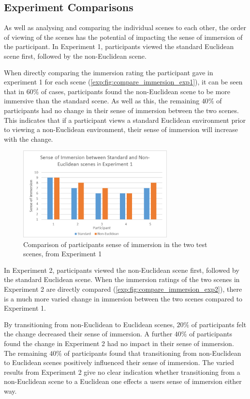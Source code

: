 		\subsection{Experiment Comparisons}
		\label{exp:exp:comp}

			As well as analysing and comparing the individual scenes to each other, the order of viewing of the scenes has the potential of impacting the sense of immersion of the participant.
			In Experiment 1, participants viewed the standard Euclidean scene first, followed by the non-Euclidean scene.

			When directly comparing the immersion rating the participant gave in experiment 1 for each scene (\autoref{exp:fig:compare_immersion_exp1}), it can be seen that in $60\%$ of cases, participants found the non-Euclidean scene to be more immersive than the standard scene.
			As well as this, the remaining $40\%$ of participants had no change in their sense of immersion between the two scenes.
			This indicates that if a participant views a standard Euclidean environment prior to viewing a non-Euclidean environment, their sense of immersion will increase with the change.

			\begin{figure}[H]
				\includegraphics[width=0.7\textwidth]{Images/Compare_Immersion_Exp_1}
				\centering
				\caption{Comparison of participants sense of immersion in the two test scenes, from Experiment 1}
				\label{exp:fig:compare_immersion_exp1}
			\end{figure}

			In Experiment 2, participants viewed the non-Euclidean scene first, followed by the standard Euclidean scene.
			When the immersion ratings of the two scenes in Experiment 2 are directly compared (\autoref{exp:fig:compare_immersion_exp2}), there is a much more varied change in immersion between the two scenes compared to Experiment 1.

			By transitioning from non-Euclidean to Euclidean scenes, $20\%$ of participants felt the change decreased their sense of immersion.
			A further $40\%$ of participants found the change in Experiment 2 had no impact in their sense of immersion.
			The remaining $40\%$ of participants found that transitioning from non-Euclidean to Euclidean scenes positively influenced their sense of immersion.
			The varied results from Experiment 2 give no clear indication whether transitioning from a non-Euclidean scene to a Euclidean one effects a users sense of immersion either way.

